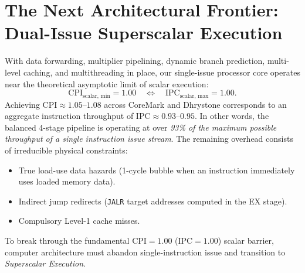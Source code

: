 
\section{The Next Architectural Frontier: Dual-Issue Superscalar Execution}\label{riscvSuperscalarFrontier}

With data forwarding, multiplier pipelining, dynamic branch prediction, multi-level caching, and multithreading in place, our single-issue processor core operates near the theoretical asymptotic limit of scalar execution:
\begin{equation}
\text{CPI}_{\text{scalar, min}} = 1.00 \quad \iff \quad \text{IPC}_{\text{scalar, max}} = 1.00.
\end{equation}
Achieving $\text{CPI} \approx 1.05\text{--}1.08$ across CoreMark and Dhrystone corresponds to an aggregate instruction throughput of $\text{IPC} \approx 0.93\text{--}0.95$. In other words, the balanced 4-stage pipeline is operating at over \textit{93\% of the maximum possible throughput of a single instruction issue stream}. The remaining overhead consists of irreducible physical constraints:
\begin{itemize}
    \item True load-use data hazards (1-cycle bubble when an instruction immediately uses loaded memory data).
    \item Indirect jump redirects (\texttt{JALR} target addresses computed in the EX stage).
    \item Compulsory Level-1 cache misses.
\end{itemize}

To break through the fundamental $\text{CPI} = 1.00$ ($\text{IPC} = 1.00$) scalar barrier, computer architecture must abandon single-instruction issue and transition to \textit{Superscalar Execution}.

